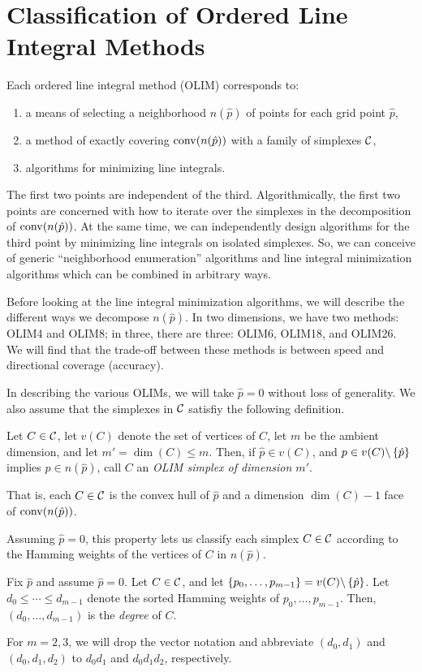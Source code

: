 \documentclass[eikonal.tex]{subfiles}
\begin{document}
\section{Classification of Ordered Line Integral Methods}

Each ordered line integral method (OLIM) corresponds to:
\begin{enumerate}
\item a means of selecting a neighborhood $n(\hat{p})$ of points for
  each grid point $\hat{p}$,
\item a method of exactly covering $\operatorname{conv}(n(\hat{p}))$ with a family
  of simplexes $\mathcal{C}$,
\item algorithms for minimizing line integrals.
\end{enumerate}
The first two points are independent of the third. Algorithmically,
the first two points are concerned with how to iterate over the
simplexes in the decomposition of $\operatorname{conv}(n(\hat{p}))$. At the same
time, we can independently design algorithms for the third point by
minimizing line integrals on isolated simplexes. So, we can conceive
of generic ``neighborhood enumeration'' algorithms and line integral
minimization algorithms which can be combined in arbitrary ways.

Before looking at the line integral minimization algorithms, we will
describe the different ways we decompose $n(\hat{p})$. In two
dimensions, we have two methods: OLIM4 and OLIM8; in three, there are
three: OLIM6, OLIM18, and OLIM26. We will find that the trade-off
between these methods is between speed and directional coverage
(accuracy).

In describing the various OLIMs, we will take $\hat{p} = 0$ without
loss of generality. We also assume that the simplexes in $\mathcal{C}$
satisfiy the following definition.
\begin{defn}\label{def:olim-simplex}
  Let $C \in \mathcal{C}$, let $v(C)$ denote the set of vertices of $C$, let
  $m$ be the ambient dimension, and let $m' = \dim(C) \leq m$. Then,
  if $\hat{p} \in v(C)$, and $p \in v(C) \backslash \left\{\hat{p}\right\}$
  implies $p \in n(\hat{p})$, call $C$ an \emph{OLIM simplex of
    dimension $m'$}.
\end{defn}
\noindent That is, each $C \in \mathcal{C}$ is the convex hull of $\hat{p}$
and a dimension $\dim(C) - 1$ face of $\operatorname{conv}(n(\hat{p}))$.

Assuming $\hat{p} = 0$, this property lets us classify each simplex
$C \in \mathcal{C}$ according to the Hamming weights of the vertices of $C$
in $n(\hat{p})$.
\begin{defn}
  Fix $\hat{p}$ and assume $\hat{p} = 0$. Let $C \in \mathcal{C}$, and let
  $\left\{p_0, \hdots, p_{m-1}\right\} = v(C) \backslash \left\{\hat{p}\right\}$. Let
  $d_0 \leq \cdots \leq d_{m-1}$ denote the sorted Hamming weights of
  $p_0, \hdots, p_{m-1}$. Then, $(d_0, \hdots, d_{m-1})$ is the
  \emph{degree} of $C$.
\end{defn}
\noindent For $m = 2, 3$, we will drop the vector notation and abbreviate
$(d_0, d_1)$ and $(d_0, d_1, d_2)$ to $d_0d_1$ and $d_0d_1d_2$,
respectively.
\end{document}
